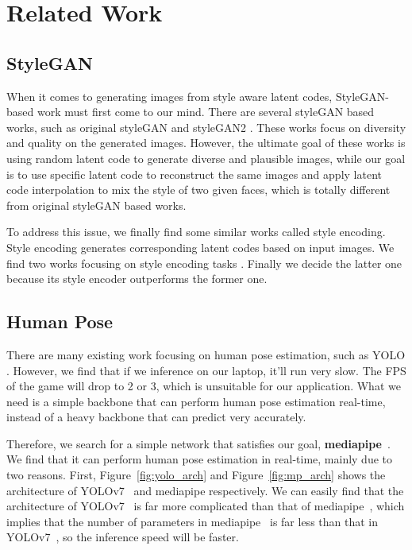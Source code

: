 \section{Related Work}
\subsection{StyleGAN}
When it comes to generating images from style aware latent codes, StyleGAN-based work must first come to our mind. There are several styleGAN based works, such as original styleGAN \cite{karras2019style} and styleGAN2 \cite{karras2020analyzing}. These works focus on diversity and quality on the generated images. However, the ultimate goal of these works is using random latent code to generate diverse and plausible images, while our goal is to use specific latent code to reconstruct the same images and apply latent code interpolation to mix the style of two given faces, which is totally different from original styleGAN based works.

To address this issue, we finally find some similar works called style encoding. Style encoding generates corresponding latent codes based on input images. We find two works focusing on style encoding tasks \cite{karras2020training} \cite{richardson2021encoding}. Finally we decide the latter one because its style encoder outperforms the former one. 

\subsection{Human Pose}
There are many existing work focusing on human pose estimation, such as YOLO \cite{yolo1} \cite{wang2022yolov7} \cite{yolo3}. However, we find that if we inference on our laptop, it'll run very slow. The FPS of the game will drop to 2 or 3, which is unsuitable for our application. What we need is a simple backbone that can perform human pose estimation real-time, instead of a heavy backbone that can predict very accurately.

Therefore, we search for a simple network that satisfies our goal, \textbf{mediapipe}~\cite{lugaresi2019mediapipe}. We find that it can perform human pose estimation in real-time, mainly due to two reasons. First, Figure~\ref{fig:yolo_arch} and Figure~\ref{fig:mp_arch} shows the architecture of YOLOv7~\cite{wang2022yolov7} and mediapipe respectively. We can easily find that the architecture of YOLOv7~\cite{wang2022yolov7} is far more complicated than that of mediapipe~\cite{lugaresi2019mediapipe}, which implies that the number of parameters in mediapipe~\cite{lugaresi2019mediapipe} is far less than that in YOLOv7~\cite{lugaresi2019mediapipe}, so the inference speed will be faster.

